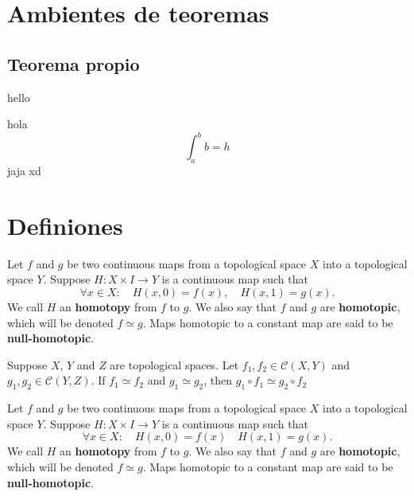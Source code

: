 \section{Ambientes de teoremas}

\lipsum[2]

\subsection{Teorema propio}
hello \lipsum[2]

\begin{theorem}
    hola \[\int_a^b b = h\]
    jaja xd
\end{theorem}

\lipsum[1]

\section{Definiones}

\lipsum[1]

\begin{definition}
    Let \(f\) and \(g\) be two continuous maps from a topological space \(X\) into a topological space \(Y\). Suppose \(H \colon X\times I \to Y\) is a continuous map such that 
    \[
        \forall x\in X :\quad H(x,0) = f(x), \quad H(x,1) = g(x).
    \]
    We call \(H\) an \textbf{homotopy} from \(f\) to \(g\). We also say that \(f\) and \(g\) are \textbf{homotopic}, which will be denoted \(f\simeq g\). Maps homotopic to a constant map are said to be \textbf{null-homotopic}.
\end{definition}

\lipsum[1]

\begin{theorem}
    Suppose \(X\), \(Y\) and \(Z\) are topological spaces. Let 
     \(f_1, f_2 \in \mathcal{C}(X,Y)\) and \(g_1, g_2 \in \mathcal{C}(Y, Z)\). If \(f_1 \simeq f_2\) and \(g_1 \simeq g_2\), then \(g_1 \circ f_1 \simeq g_2\circ f_2\)
\end{theorem}

\lipsum[1]

\begin{definition}
    Let \(f\) and \(g\) be two continuous maps from a topological space \(X\) into a topological space \(Y\). Suppose \(H \colon X\times I \to Y\) is a continuous map such that 
    \[
        \forall x\in X :\quad H(x,0) = f(x) \quad H(x,1) = g(x).
    \]
    We call \(H\) an \textbf{homotopy} from \(f\) to \(g\). We also say that \(f\) and \(g\) are \textbf{homotopic}, which will be denoted \(f\simeq g\). Maps homotopic to a constant map are said to be \textbf{null-homotopic}.

\end{definition}

\lipsum[1-2]